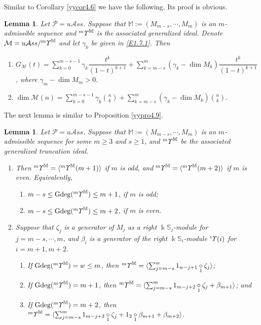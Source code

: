 \documentclass{amsart}
\newtheorem{lem}[thm]{Lemma}
\theoremstyle{definition}
\theoremstyle{remark}
\numberwithin{equation}{section}
\def\S{\mathbb{S}}
\def\gd{\operatorname{Gdeg}}
\newcommand{\lr}[1]{\langle #1 \rangle}
\newcommand{\ucr}[1]{\underset{#1}{\circ}}
\newcommand{\up}[1]{{^{#1}{\it \!\Upsilon}}}
\newcommand{\upa}[1]{{^{#1}{\it \!\Upsilon}}}
\def \uas{u\mathcal{A}ss}
\def \ip{{\mathcal{P}}}
\def \dim{\operatorname{dim}}
\def \S{\mathbb{S}}
\begin{document}
Similar to Corollary \ref{yycor4.6} we have the following.
Its proof is obvious.

\begin{lem}	
\label{yylem4.14}
Let $\ip=\uas$.  Suppose that ${\mathbb M}:=(M_{m-s},\cdots, M_{m})$ is an $m$-admissible 
sequence and $\upa{m}^{\mathbb M}$ is the associated generalized
ideal. Denote $\mathcal{M}=\uas/\upa{m}^{\mathbb M}$ 
and let $\gamma_k$ be given in \eqref{E1.7.1}. Then 
\begin{enumerate}
\item[(1)] 
$G_{\mathcal{M}}(t)=\sum\limits_{k=0}^{m-s-1} \gamma_k
\dfrac{t^k}{(1-t)^{k+1}}+
\sum\limits_{k=m-s}^{m} (\gamma_{k}-\dim M_{k})
\dfrac{t^{k}}{(1-t)^{k+1}}$,  where $\gamma_m-\dim M_m>0$.
\item[(2)] 
$\dim \mathcal{M}(n)=\sum\limits_{k=0}^{m-s-1} 
\gamma_k {n\choose k}+\sum\limits_{k=m-s}^{m} 
(\gamma_{k}-\dim M_{k}){n\choose k}$.
\end{enumerate}
\end{lem} 

The next lemma is similar to Proposition \ref{yypro4.9}.

\begin{lem}
\label{yylem4.15}
Let $\ip=\uas$. Suppose that ${\mathbb M}:=(M_{m-s},\cdots,M_{m})$ is an 
$m$-admissible sequence  for some $m\ge 3$ and $s\geq 1$, and 
$\upa{m}^{\mathbb M}$ be the associated generalized truncation 
ideal. 
\begin{enumerate}
\item[(1)]
Then $\upa{m}^{\mathbb M}=\langle \upa{m}^{\mathbb M}(m+1)\rangle$ if 
$m$ is odd, and $\upa{m}^{\mathbb M}=\langle \upa{m}^{\mathbb M}(m+2)\rangle$ if 
$m$ is even. Equivalently,
\begin{enumerate}
\item[(1a)] $m-s\le \gd(\upa{m}^{\mathbb M})\le m+1$, if $m$ is odd;
\item[(1b)] $m-s\le \gd(\upa{m}^{\mathbb M})\le m+2$, if $m$ is even.
\end{enumerate}
\item[(2)]
Suppose that $\zeta_{j}$ is a generator of $M_{j}$ as a 
right $\Bbbk\S_{j}$-module for $j=m-s,\cdots,m$, and 
$\beta_{i}$ is a generator of the right $\Bbbk\S_{i}$-module 
$\up{i}(i)$ for $i=m+1, m+2$.
\begin{enumerate}
\item[(2a)] 
If $\gd(\upa{m}^{\mathbb M})=w\leq m$, then $\upa{m}^{\mathbb M}=
\lr{\sum_{j=m-s}^{w} 1_{w-j+1} \ucr{1}\zeta_{j}}$;
\item[(2b)] 
If $\gd(\upa{m}^{\mathbb M})=m+1$, then $\upa{m}^{\mathbb M}=
\lr{\sum_{j=m-s}^{m} 1_{m-j+2} \ucr{1}\zeta_{j}+\beta_{m+1}}$; and 
\item[(2c)] 
If $\gd(\upa{m}^{\mathbb M})=m+2$, then $\upa{m}^{\mathbb M}=
\lr{\sum_{j=m-s}^{m} 1_{m-j+3} \ucr{1}\zeta_{j}+1_{2}\ucr{1} \beta_{m+1}
+\beta_{m+2}}$.
\end{enumerate}
\end{enumerate}
\end{lem}
\end{document}
